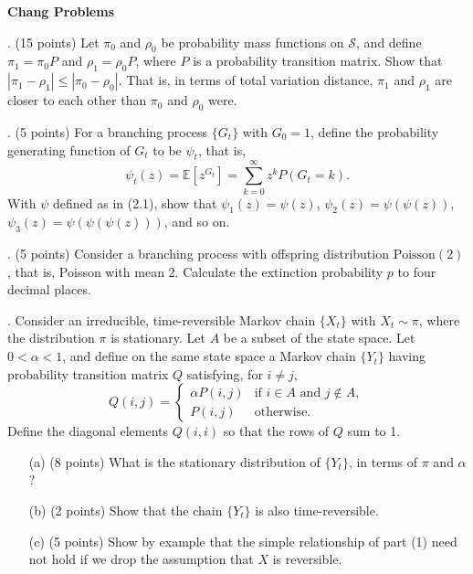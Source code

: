 \documentclass{article}
\begin{document}
\textbf{Chang Problems}

. (15 points) Let $\pi_0$ and $\rho_0$ be probability mass
functions on $\mathcal{S}$, and define $\pi_1 = \pi_0 P$ and $\rho_1 = \rho_0
P$, where $P$ is a probability transition matrix. Show that $|\pi_1 - \rho_1|
\leq |\pi_0 - \rho_0|$. That is, in terms of total variation distance, $\pi_1$
and $\rho_1$ are closer to each other than $\pi_0$ and $\rho_0$ were.

. (5 points) For a branching process $\{G_t\}$ with $G_0 = 1$, define the probability generating function of $G_t$ to be $\psi_t$, that is,
\[
\psi_t(z) = \mathbb{E}[z^{G_t}] = \sum_{k=0}^{\infty} z^k P(G_t = k).
\]
With $\psi$ defined as in (2.1), show that $\psi_1(z) = \psi(z)$, $\psi_2(z) = \psi(\psi(z))$, $\psi_3(z) = \psi(\psi(\psi(z)))$, and so on.

\bigskip

. (5 points) Consider a branching process with offspring distribution $\text{Poisson}(2)$, that is, Poisson with mean 2. Calculate the extinction probability $p$ to four decimal places.

\bigskip

. Consider an irreducible, time-reversible Markov chain $\{X_t\}$ with $X_t \sim \pi$, where the distribution $\pi$ is stationary. Let $A$ be a subset of the state space. Let $0 < \alpha < 1$, and define on the same state space a Markov chain $\{Y_t\}$ having probability transition matrix $Q$ satisfying, for $i \neq j$,
\[
Q(i,j) =
\begin{cases}
\alpha P(i,j) & \text{if } i \in A \text{ and } j \notin A, \\
P(i,j) & \text{otherwise}.
\end{cases}
\]
Define the diagonal elements $Q(i,i)$ so that the rows of $Q$ sum to 1.
\begin{itemize}
    \item[(a)] (8 points) What is the stationary distribution of $\{Y_t\}$, in terms of $\pi$ and $\alpha$?

    \textcolor{blue}{}

    \item[(b)] (2 points) Show that the chain $\{Y_t\}$ is also time-reversible.

    \textcolor{blue}{}


    \item[(c)] (5 points) Show by example that the simple relationship of part (1) need not hold if we drop the assumption that $X$ is reversible.

    \textcolor{blue}{}

\end{itemize}
\end{document}
